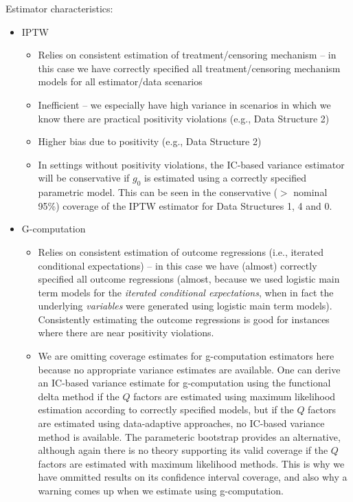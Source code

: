 \documentclass[answers]{exam}
\begin{document}
\begin{solution}
Estimator characteristics:
\begin{itemize}
\item IPTW
\begin{itemize}
\item Relies on consistent estimation of treatment/censoring mechanism -- in this case we have correctly specified all treatment/censoring mechanism models for all estimator/data scenarios
\item Inefficient -- we especially have high variance in scenarios in which we know there are practical positivity violations (e.g., Data Structure 2)
\item Higher bias due to positivity (e.g., Data Structure 2)
\item In settings without positivity violations, the IC-based variance estimator will be conservative if $g_0$ is estimated using a correctly specified parametric model. This can be seen in the conservative ($>$ nominal 95\%) coverage of the IPTW estimator for Data Structures 1, 4 and 0.
\end{itemize}
\item G-computation
\begin{itemize}
\item Relies on consistent estimation of outcome regressions (i.e., iterated conditional expectations) -- in this case we have (almost) correctly specified all outcome regressions (almost, because we used logistic main term models for the \textit{iterated conditional expectations}, when in fact the underlying \textit{variables} were generated using logistic main term models). Consistently estimating the outcome regressions is good for instances where there are near positivity violations.
\item We are omitting coverage estimates for g-computation estimators here because no appropriate variance estimates are available. One can derive an IC-based variance estimate for g-computation using the functional delta method if the $Q$ factors are estimated using maximum likelihood estimation according to correctly specified models, but if the $Q$ factors are estimated using data-adaptive approaches, no IC-based variance method is available. The parameteric bootstrap provides an alternative, although again there is no theory supporting its valid coverage if the $Q$ factors are estimated with maximum likelihood methods. This is why we have ommitted results on its confidence interval coverage, and also why a warning comes up when we estimate using g-computation.

\end{itemize}
\end{itemize}
\end{solution}
\end{document}
